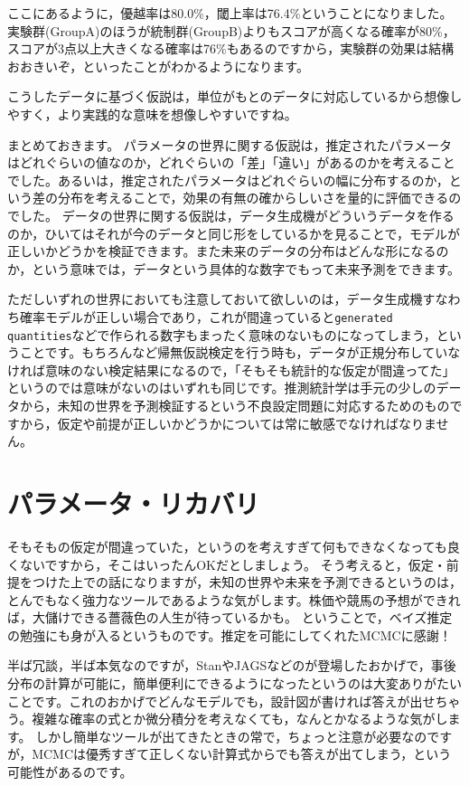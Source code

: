 \documentclass{ltjsbook}
\begin{document}
ここにあるように，優越率は80.0\%，閾上率は76.4\%ということになりました。実験群(GroupA)のほうが統制群(GroupB)よりもスコアが高くなる確率が80\%，スコアが3点以上大きくなる確率は76\%もあるのですから，実験群の効果は結構おおきいぞ，といったことがわかるようになります。

こうしたデータに基づく仮説は，単位がもとのデータに対応しているから想像しやすく，より実践的な意味を想像しやすいですね。

まとめておきます。
パラメータの世界に関する仮説は，推定されたパラメータはどれぐらいの値なのか，どれぐらいの「差」「違い」があるのかを考えることでした。あるいは，推定されたパラメータはどれぐらいの幅に分布するのか，という差の分布を考えることで，効果の有無の確からしいさを量的に評価できるのでした。
データの世界に関する仮説は，データ生成機がどういうデータを作るのか，ひいてはそれが今のデータと同じ形をしているかを見ることで，モデルが正しいかどうかを検証できます。また未来のデータの分布はどんな形になるのか，という意味では，データという具体的な数字でもって未来予測をできます。

ただしいずれの世界においても注意しておいて欲しいのは，データ生成機すなわち確率モデルが正しい場合であり，これが間違っていると\verb|generated quantities|などで作られる数字もまったく意味のないものになってしまう，ということです。もちろんなど帰無仮説検定を行う時も，データが正規分布していなければ意味のない検定結果になるので，「そもそも統計的な仮定が間違ってた」というのでは意味がないのはいずれも同じです。推測統計学は手元の少しのデータから，未知の世界を予測検証するという不良設定問題に対応するためのものですから，仮定や前提が正しいかどうかについては常に敏感でなければなりません。

\section{パラメータ・リカバリ}
そもそもの仮定が間違っていた，というのを考えすぎて何もできなくなっても良くないですから，そこはいったんOKだとしましょう。
そう考えると，仮定・前提をつけた上での話になりますが，未知の世界や未来を予測できるというのは，とんでもなく強力なツールであるような気がします。株価や競馬の予想ができれば，大儲けできる薔薇色の人生が待っているかも。
ということで，ベイズ推定の勉強にも身が入るというものです。推定を可能にしてくれたMCMCに感謝！

半ば冗談，半ば本気なのですが，StanやJAGSなどのが登場したおかげで，事後分布の計算が可能に，簡単便利にできるようになったというのは大変ありがたいことです。これのおかげでどんなモデルでも，設計図が書ければ答えが出せちゃう。複雑な確率の式とか微分積分を考えなくても，なんとかなるような気がします。
しかし簡単なツールが出てきたときの常で，ちょっと注意が必要なのですが，MCMCは優秀すぎて正しくない計算式からでも答えが出てしまう，という可能性があるのです。
\end{document}
